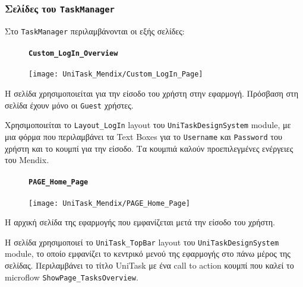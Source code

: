             \subsubsection{Σελίδες του \texttt{TaskManager}}
                Στο \texttt{TaskManager} περιλαμβάνονται οι εξής σελίδες:

                \begin{figure}[H] \noindent
                    \paragraph{\texttt{Custom\_LogIn\_Overview}}
                    \begin{center}
                        \texttt{[image: UniTask\_Mendix/Custom\_LogIn\_Page]}
                    \end{center}
                \end{figure}

                Η σελίδα χρησιμοποιείται για την είσοδο του χρήστη στην εφαρμογή. Πρόσβαση στη σελίδα έχουν μόνο οι \texttt{Guest} χρήστες.

                Χρησιμοποιείται το \texttt{Layout\_LogIn} layout του \texttt{UniTaskDesignSystem} module, με μια φόρμα που περιλαμβάνει τα Text Boxes για το \texttt{Username} και \texttt{Password} του χρήστη και το κουμπί για την είσοδο. Τα κουμπιά καλούν προεπιλεγμένες ενέργειες του Mendix.

                \begin{figure}[H] \noindent
                    \paragraph{\texttt{PAGE\_Home\_Page}}
                    \begin{center}
                        \texttt{[image: UniTask\_Mendix/PAGE\_Home\_Page]}
                    \end{center}
                \end{figure}

                Η αρχική σελίδα της εφαρμογής που εμφανίζεται μετά την είσοδο του χρήστη.

                Η σελίδα χρησιμοποιεί το \texttt{UniTask\_TopBar} layout του \texttt{UniTaskDesignSystem} module, το οποίο εμφανίζει το κεντρικό μενού της εφαρμογής στο πάνω μέρος της σελίδας. Περιλαμβάνει το τίτλο {\ZonaSB UniTask} με ένα call to action κουμπί που καλεί το microflow \texttt{ShowPage\_TasksOverview}.

